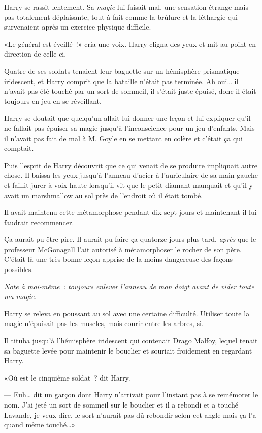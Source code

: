 Harry se rassit lentement. Sa \emph{magie} lui faisait mal, une sensation étrange mais pas totalement déplaisante, tout à fait comme la brûlure et la léthargie qui survenaient après un exercice physique difficile.

«Le général est éveillé~!» cria une voix. Harry cligna des yeux et mit au point en direction de celle-ci.

Quatre de ses soldats tenaient leur baguette sur un hémisphère prismatique iridescent, et Harry comprit que la bataille n'était pas terminée. Ah oui… il n'avait pas été touché par un sort de sommeil, il s'était juste épuisé, donc il était toujours en jeu en se réveillant.

Harry se doutait que quelqu'un allait lui donner une leçon et lui expliquer qu'il ne fallait pas épuiser sa magie jusqu'à l'inconscience pour un jeu d'enfants. Mais il n'avait pas fait de mal à M. Goyle en se mettant en colère et c'était ça qui comptait.

Puis l'esprit de Harry découvrit que ce qui venait de se produire impliquait autre chose. Il baissa les yeux jusqu'à l'anneau d'acier à l'auriculaire de sa main gauche et faillit jurer à voix haute lorsqu'il vit que le petit diamant manquait et qu'il y avait un marshmallow au sol près de l'endroit où il était tombé.

Il avait maintenu cette métamorphose pendant dix-sept jours et maintenant il lui faudrait recommencer.

Ça aurait pu être pire. Il aurait pu faire ça quatorze jours plus tard, \emph{après} que le professeur McGonagall l'ait autorisé à métamorphoser le rocher de son père. C'était là une très bonne leçon apprise de la moins dangereuse des façons possibles.

\emph{Note à moi-même~: toujours enlever l'anneau de mon doigt avant de vider toute ma magie.}

Harry se releva en poussant au sol avec une certaine difficulté. Utiliser toute la magie n'épuisait pas les muscles, mais courir entre les arbres, si.

Il tituba jusqu'à l'hémisphère iridescent qui contenait Drago Malfoy, lequel tenait sa baguette levée pour maintenir le bouclier et souriait froidement en regardant Harry.

«Où est le cinquième soldat~? dit Harry.

--- Euh… dit un garçon dont Harry n'arrivait pour l'instant pas à se remémorer le nom. J'ai jeté un sort de sommeil sur le bouclier et il a rebondi et a touché Lavande, je veux dire, le sort n'aurait pas dû rebondir selon cet angle mais ça l'a quand même touché…»

